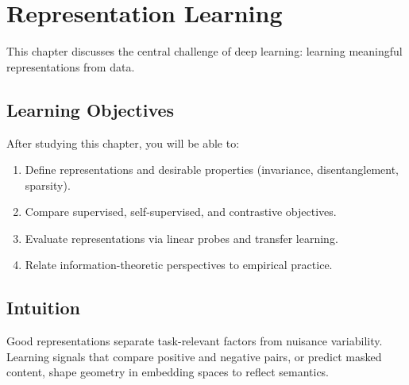 
\chapter{Representation Learning}
\label{chap:representation-learning}

This chapter discusses the central challenge of deep learning: learning meaningful representations from data.


\section*{Learning Objectives}

After studying this chapter, you will be able to:

\begin{enumerate}
    \item Define representations and desirable properties (invariance, disentanglement, sparsity).
    \item Compare supervised, self-supervised, and contrastive objectives.
    \item Evaluate representations via linear probes and transfer learning.
    \item Relate information-theoretic perspectives to empirical practice.
\end{enumerate}



\section*{Intuition}

Good representations separate task-relevant factors from nuisance variability. Learning signals that compare positive and negative pairs, or predict masked content, shape geometry in embedding spaces to reflect semantics.












